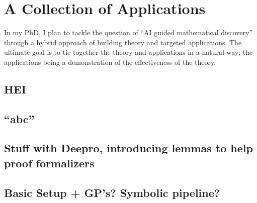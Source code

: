 \chapter{A Collection of Applications}
In my PhD, I plan to tackle the question of ``AI guided mathematical discovery'' through a hybrid approach of building theory and targeted applications. The ultimate goal is to tie together the theory and applications in a natural way; the applications being a demonstration of the effectiveness of the theory.
\section{HEI}
\section{``abc''}
\section{Stuff with Deepro, introducing lemmas to help proof formalizers}
\section{Basic Setup + GP's? Symbolic pipeline?}